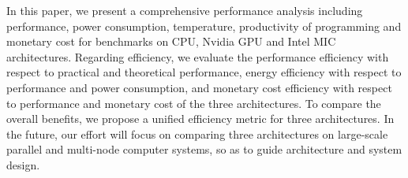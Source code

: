 In this paper, we present a comprehensive performance analysis including performance, power consumption, temperature, productivity of programming and monetary cost for benchmarks on CPU, Nvidia GPU and Intel MIC architectures. Regarding efficiency, we evaluate the performance efficiency with respect to practical and theoretical performance, energy efficiency with respect to performance and power consumption, and monetary cost efficiency with respect to performance and monetary cost of the three architectures. To compare the overall benefits, we propose a unified efficiency metric for three architectures. In the future, our effort will focus on comparing three architectures on large-scale parallel and multi-node computer systems, so as to guide architecture and system design.

